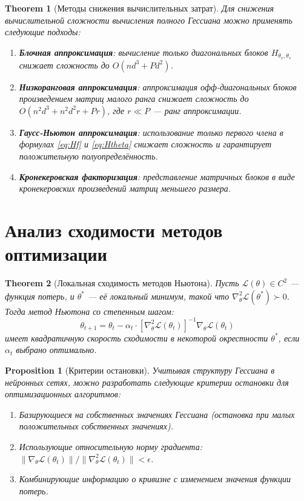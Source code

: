\documentclass[11pt]{article}
\newtheorem{theorem}{Theorem}
\newtheorem{proposition}{Proposition}
\begin{document}
\begin{theorem}[Методы снижения вычислительных затрат]
  Для снижения вычислительной сложности вычисления полного Гессиана можно применять следующие подходы:
  \begin{enumerate}
    \item \textbf{Блочная аппроксимация}: вычисление только диагональных блоков $H_{\theta_v, \theta_v}$
      снижает сложность до $O(n d^3 + P d^2)$.
    \item \textbf{Низкоранговая аппроксимация}: аппроксимация офф-диагональных блоков произведением матриц
      малого ранга снижает сложность до $O(n^2 d^3 + n^2 d^2 r + P r)$, где $r \ll P$ — ранг аппроксимации.
    \item \textbf{Гаусс-Ньютон аппроксимация}: использование только первого члена в формулах \eqref{eq:Hf} и
      \eqref{eq:Htheta} снижает сложность и гарантирует положительную полуопределённость.
    \item \textbf{Кронекеровская факторизация}: представление матричных блоков в виде кронекеровских
      произведений матриц меньшего размера.
  \end{enumerate}
\end{theorem}

\section{Анализ сходимости методов оптимизации}

\begin{theorem}[Локальная сходимость методов Ньютона]
  Пусть $\mathcal{L}(\theta) \in C^2$ — функция потерь, и $\theta^*$ — её локальный минимум, такой что
  $\nabla^2_\theta \mathcal{L}(\theta^*) \succ 0$. Тогда метод Ньютона со степенным шагом:
  \[
    \theta_{t+1} = \theta_t - \alpha_t \cdot [\nabla^2_\theta \mathcal{L}(\theta_t)]^{-1} \nabla_\theta
    \mathcal{L}(\theta_t)
  \]
  имеет квадратичную скорость сходимости в некоторой окрестности $\theta^*$, если $\alpha_t$ выбрано оптимально.
\end{theorem}

\begin{proposition}[Критерии остановки]
  Учитывая структуру Гессиана в нейронных сетях, можно разработать следующие критерии остановки для
  оптимизационных алгоритмов:
  \begin{enumerate}
    \item Базирующиеся на собственных значениях Гессиана (остановка при малых положительных собственных значениях).
    \item Использующие относительную норму градиента: $\|\nabla_\theta \mathcal{L}(\theta_t)\| /
      \|\nabla^2_\theta \mathcal{L}(\theta_t)\| < \epsilon$.
    \item Комбинирующие информацию о кривизне с изменением значения функции потерь.
  \end{enumerate}
\end{proposition}
\end{document}
